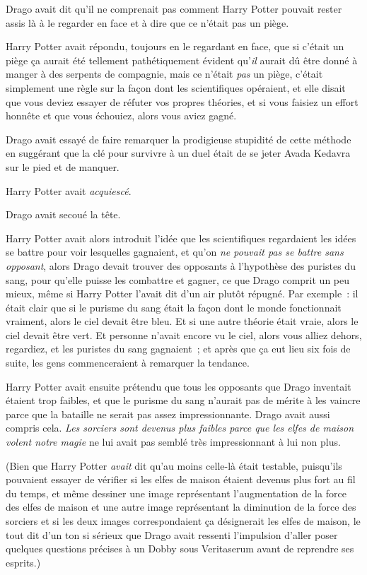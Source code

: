 Drago avait dit qu'il ne comprenait pas comment Harry Potter pouvait rester assis là à le regarder en face et à dire que ce n'était pas un piège.

Harry Potter avait répondu, toujours en le regardant en face, que si c'était un piège ça aurait été tellement pathétiquement évident qu'\emph{il} aurait dû être donné à manger à des serpents de compagnie, mais ce n'était \emph{pas} un piège, c'était simplement une règle sur la façon dont les scientifiques opéraient, et elle disait que vous deviez essayer de réfuter vos propres théories, et si vous faisiez un effort honnête et que vous échouiez, alors vous aviez gagné.

Drago avait essayé de faire remarquer la prodigieuse stupidité de cette méthode en suggérant que la clé pour survivre à un duel était de se jeter Avada Kedavra sur le pied et de manquer.

Harry Potter avait \emph{acquiescé}.

Drago avait secoué la tête.

Harry Potter avait alors introduit l'idée que les scientifiques regardaient les idées se battre pour voir lesquelles gagnaient, et qu'on \emph{ne pouvait pas se battre sans opposant}, alors Drago devait trouver des opposants à l'hypothèse des puristes du sang, pour qu'elle puisse les combattre et gagner, ce que Drago comprit un peu mieux, même si Harry Potter l'avait dit d'un air plutôt répugné. Par exemple~: il était clair que si le purisme du sang était la façon dont le monde fonctionnait vraiment, alors le ciel devait être bleu. Et si une autre théorie était vraie, alors le ciel devait être vert. Et personne n'avait encore vu le ciel, alors vous alliez dehors, regardiez, et les puristes du sang gagnaient~; et après que ça eut lieu six fois de suite, les gens commenceraient à remarquer la tendance.

Harry Potter avait ensuite prétendu que tous les opposants que Drago inventait étaient trop faibles, et que le purisme du sang n'aurait pas de mérite à les vaincre parce que la bataille ne serait pas assez impressionnante. Drago avait aussi compris cela. \emph{Les sorciers sont devenus plus faibles parce que les elfes de maison volent notre magie} ne lui avait pas semblé très impressionnant à lui non plus.

(Bien que Harry Potter \emph{avait} dit qu'au moins celle-là était testable, puisqu'ils pouvaient essayer de vérifier si les elfes de maison étaient devenus plus fort au fil du temps, et même dessiner une image représentant l'augmentation de la force des elfes de maison et une autre image représentant la diminution de la force des sorciers et si les deux images correspondaient ça désignerait les elfes de maison, le tout dit d'un ton si sérieux que Drago avait ressenti l'impulsion d'aller poser quelques questions précises à un Dobby sous Veritaserum avant de reprendre ses esprits.)

